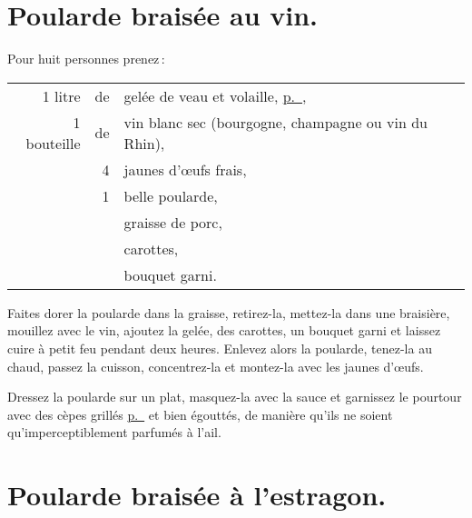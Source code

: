 \section*{\centering Poularde braisée au vin.}
{}

Pour huit personnes prenez :

\medskip

\footnotesize
\begin{longtable}{rrp{16em}}
  1 litre & de & gelée de veau et volaille, \hyperlink{p0418}{p. \pageref{pg0418}},                       \\
        1 bouteille & de & vin blanc sec (bourgogne, champagne ou vin du Rhin),                           \\
                    &  4 & jaunes d'œufs frais,                                                           \\
                    &  1 & belle poularde,                                                                \\
                    &    & graisse de porc,                                                               \\
                    &    & carottes,                                                                      \\
                    &    & bouquet garni.                                                                 \\
\end{longtable}
\normalsize

Faites dorer la poularde dans la graisse, retirez-la, mettez-la dans une
braisière, mouillez avec le vin, ajoutez la gelée, des carottes, un bouquet
garni et laissez cuire à petit feu pendant deux heures. Enlevez alors la
poularde, tenez-la au chaud, passez la cuisson, concentrez-la et montez-la avec
les jaunes d'œufs.

Dressez la poularde sur un plat, masquez-la avec la sauce et garnissez le
pourtour avec des cèpes grillés \hyperlink{p0805}{p. \pageref{pg0805}} et bien
égouttés, de manière qu'ils ne soient qu'imperceptiblement parfumés à l'ail.

\section*{\centering Poularde braisée à l'estragon.}
{}


